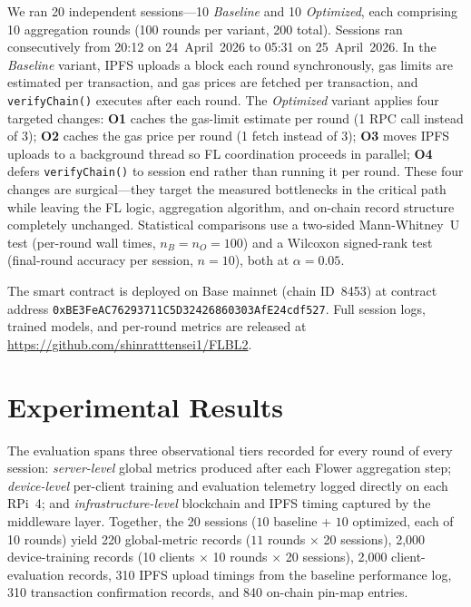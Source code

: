 \documentclass{llncs}
\begin{document}
We ran 20 independent sessions---10 \emph{Baseline} and 10 \emph{Optimized},
each comprising 10 aggregation rounds (100 rounds per variant, 200 total).
Sessions ran consecutively from 20:12 on 24~April~2026 to 05:31 on
25~April~2026. In the \emph{Baseline} variant, IPFS uploads a block each round
synchronously, gas limits are estimated per transaction, and gas prices are
fetched per transaction, and \texttt{verifyChain()} executes after each round.
The \emph{Optimized} variant applies four targeted changes: \textbf{O1}
caches the gas-limit estimate per round (1 RPC call instead of 3);
\textbf{O2} caches the gas price per round (1 fetch instead of 3);
\textbf{O3} moves IPFS uploads to a background thread so FL coordination
proceeds in parallel; \textbf{O4} defers \texttt{verifyChain()} to session
end rather than running it per round. These four changes are surgical---they
target the measured bottlenecks in the critical path while leaving the FL
logic, aggregation algorithm, and on-chain record structure completely
unchanged. Statistical comparisons use a two-sided Mann-Whitney~U test
(per-round wall times, $n_B = n_O = 100$) and a Wilcoxon signed-rank test
(final-round accuracy per session, $n=10$), both at $\alpha=0.05$.

{\sloppy\noindent%
The smart contract is deployed on Base mainnet (chain ID~8453) at
contract address
\texttt{0xBE3FeA\allowbreak C76293711\allowbreak C5D32426\allowbreak 860303Af\allowbreak E24cdf527}.
Full session logs, trained models, and per-round metrics are released
at \url{https://github.com/shinratttensei1/FLBL2}.\par}


\FloatBarrier
\section{Experimental Results}
\label{sec:results}

The evaluation spans three observational tiers recorded for every round of
every session: \textit{server-level} global metrics produced after each
Flower aggregation step; \textit{device-level} per-client training and
evaluation telemetry logged directly on each RPi~4; and
\textit{infrastructure-level} blockchain and IPFS timing captured by the
middleware layer. Together, the 20 sessions ($10$ baseline + $10$ optimized,
each of 10 rounds) yield 220 global-metric records ($11$ rounds $\times$ 20
sessions), 2{,}000 device-training records (10 clients $\times$ 10 rounds
$\times$ 20 sessions), 2{,}000 client-evaluation records, 310 IPFS upload
timings from the baseline performance log, 310 transaction confirmation
records, and 840 on-chain pin-map entries.
\end{document}

